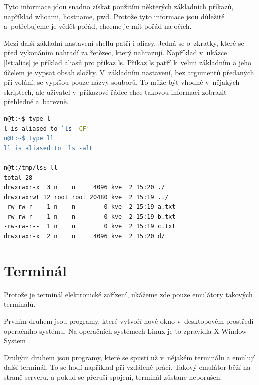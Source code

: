 \documentclass[thesis=M,czech]{FITthesis}[2012/06/26]
\begin{document}
Tyto informace jdou snadno získat použitím některých základních příkazů, například whoami, hostname, pwd. Protože tyto informace jsou důležité a~potřebujeme je vědět pořád, chceme je mít pořád na očích.

Mezi další základní nastavení shellu patří i aliasy. Jedná se o~zkratky, které se před vykonáním nahradí za řetězec, který nahrazují. Například v~ukázce \ref{lst:alias} je příklad aliasů pro příkaz ls. Příkaz ls patří k~velmi základním a jeho účelem je vypsat obsah složky. V~základním nastavení, bez argumentů předaných při volání, se vypíšou pouze názvy souborů. To může být vhodné v~nějakých skriptech, ale uživatel v~příkazové řádce chce takovou informaci zobrazit přehledně a~barevně.

\noindent
\begin{minipage}{\linewidth}
\begin{lstlisting}[language=bash, caption={Příklad použití aliasu v~Bashi}, label={lst:alias}]
n@t:~$ type l
l is aliased to `ls -CF'
n@t:~$ type ll
ll is aliased to `ls -alF'

n@t:/tmp/ls$ ll
total 28
drwxrwxr-x  3 n    n     4096 kve  2 15:20 ./
drwxrwxrwt 12 root root 20480 kve  2 15:19 ../
-rw-rw-r--  1 n    n        0 kve  2 15:19 a.txt
-rw-rw-r--  1 n    n        0 kve  2 15:19 b.txt
-rw-rw-r--  1 n    n        0 kve  2 15:19 c.txt
drwxrwxr-x  2 n    n     4096 kve  2 15:20 d/
\end{lstlisting}
\end{minipage}

%
%
%
\section{Terminál}


Protože je terminál elektronické zařízení, ukážeme zde pouze emulátory takových terminálů.

Prvním druhem jsou programy, které vytvoří nové okno v~desktopovém prostředí operačního systému. Na operačních systémech Linux je to zpravidla X Window System \cite{xorg}.

Druhým druhem jsou programy, které se spustí už v~nějakém terminálu a emulují další terminál. To se hodí například při vzdálené práci. Takový emulátor běží na straně serveru, a pokud se přeruší spojení, terminál zůstane neporušen.
\end{document}
